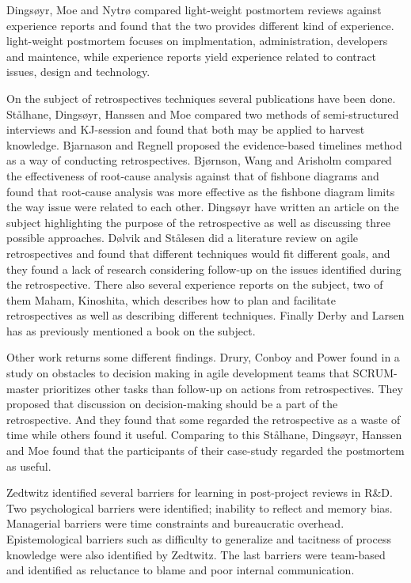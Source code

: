 Dingsøyr, Moe and Nytrø compared light-weight postmortem reviews against experience reports and found that the two provides different kind of experience. light-weight postmortem focuses on implmentation, administration, developers and maintence, while experience reports yield experience related to contract issues, design and technology. 

On the subject of retrospectives techniques several publications have been done. Stålhane, Dingsøyr, Hanssen and Moe\cite{Hanssen2003} compared two methods of semi-structured interviews and KJ-session and found that both may be applied to harvest knowledge. Bjarnason and Regnell\cite{Bjarnason2012} proposed the evidence-based timelines method as a way of conducting retrospectives. Bjørnson, Wang and Arisholm\cite{bjornson2009} compared the effectiveness of root-cause analysis against that of fishbone diagrams and found that root-cause analysis was more effective as the fishbone diagram limits the way issue were related to each other. Dingsøyr\cite{Dingsoyr2004} have written an article on the subject highlighting the purpose of the retrospective as well as discussing three possible approaches. Dølvik and Stålesen\cite{Dolvik2014} did a literature review on agile retrospectives and found that different techniques would fit different goals, and they found a lack of research considering follow-up on the issues identified during the retrospective. There also several experience reports on the subject, two of them Maham\cite{Maham2008}, Kinoshita\cite{Kinoshita2008}, which describes how to plan and facilitate retrospectives as well as describing different techniques. Finally Derby and Larsen\cite{Larsen2006} has as previously mentioned a book on the subject. 

Other work returns some different findings. Drury, Conboy and Power\cite{Drury2012} found in a study on obstacles to decision making in agile development teams that SCRUM-master prioritizes other tasks than follow-up on actions from retrospectives. They proposed that discussion on decision-making should be a part of the retrospective. And they found that some regarded the retrospective as a waste of time while others found it useful. Comparing to this Stålhane, Dingsøyr, Hanssen and Moe\cite{Hanssen2003} found that the participants of their case-study regarded the postmortem as useful. 

Zedtwitz\cite{Zedtwitz2002} identified several barriers for learning in post-project reviews in R\&D. Two psychological barriers were identified; inability to reflect and memory bias. Managerial barriers were time constraints and bureaucratic overhead. Epistemological barriers such as difficulty to generalize and tacitness of process knowledge were also identified by Zedtwitz. The last barriers were team-based and identified as reluctance to blame and poor internal communication. 

